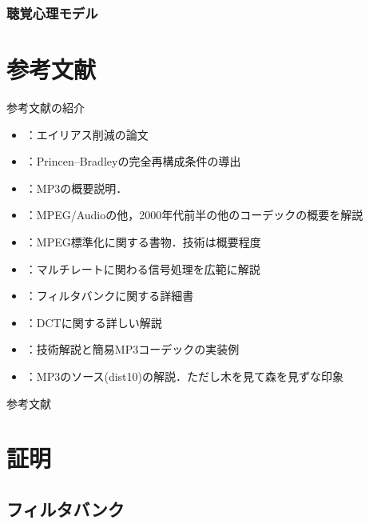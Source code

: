 \documentclass[14pt,xcolor=dvipsnames,table,dvipdfmx]{beamer}
\begin{document}
\begin{frame}[c]
    \frametitle{聴覚心理モデル}
\end{frame}

\appendix

\section{参考文献}

\begin{frame}{参考文献の紹介}
    \scriptsize
    \begin{itemize}
        \item \cite{edler1992aliasing,liu1997design}：エイリアス削減の論文
        \item \cite{princen1986analysis}：Princen--Bradleyの完全再構成条件の導出
        \item \cite{raissi2002theory}：MP3の概要説明．
        \item \cite{fujiwara2001}：MPEG/Audioの他，2000年代前半の他のコーデックの概要を解説
        \item \cite{yasuda1994}：MPEG標準化に関する書物．技術は概要程度
        \item \cite{kiya1995}：マルチレートに関わる信号処理を広範に解説
        \item \cite{vaidyanathan2002}：フィルタバンクに関する詳細書
        \item \cite{kiya1997}：DCTに関する詳しい解説
        \item \cite{kosugi200108,kosugi200109,kosugi200111,kosugi200201,kosugi200202}：技術解説と簡易MP3コーデックの実装例
        \item \cite{urata1999}：MP3のソース(dist10)の解説．ただし木を見て森を見ずな印象
    \end{itemize}
\end{frame}

\begin{frame}[allowframebreaks]{参考文献}
    \scriptsize
    \printbibliography[heading=none]
\end{frame}

\section{証明}

\subsection{フィルタバンク} \label{sec:proofs_filter_bank}
\end{document}
